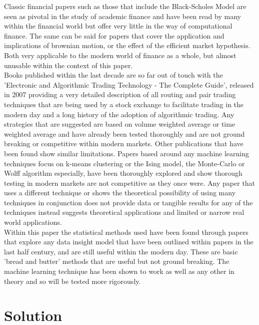\documentclass[12pt,a4paper]{article}
\begin{document}
Classic financial papers such as those that include the Black-Scholes Model are seen as pivotal in the study of academic finance and have been read by many within the financial world but offer very little in the way of computational finance. The same can be said for papers that cover the application and implications of brownian motion, or the effect of the efficient market hypothesis. Both very applicable to the modern world of finance as a whole, but almost unusable within the context of this paper. \\

Books published within the last decade are so far out of touch with the 'Electronic and Algorithmic Trading Technology - The Complete Guide', released in 2007 providing a very detailed description of all routing and pair trading techniques that are being used by a stock exchange to facilitate trading in the modern day and a long history of the adoption of algorithmic trading. Any strategies that are suggested are based on volume weighted average or time weighted average and have already been tested thoroughly and are not ground breaking or competitive within modern markets. Other publications that have been found show similar limitations. Papers based around any machine learning techniques focus on k-means clustering or the Ising model, the Monte-Carlo or Wolff algorithm especially, have been thoroughly explored and show thorough testing in modern markets are not competitive as they once were. Any paper that uses a different technique or shows the theoretical possibility of using many techniques in conjunction does not provide data or tangible results for any of the techniques instead suggests theoretical applications and limited or narrow real world applications.\\

Within this paper the statistical methods used have been found through papers that explore any data insight model that have been outlined within papers in the last half century, and are still useful within the modern day. These are basic 'bread and butter' methods that are useful but not ground breaking. The machine learning technique has been shown to work as well as any other in theory and so will be tested more rigorously.\\

\iffalse
#################################################################################
\fi

\section{Solution}
\end{document}
